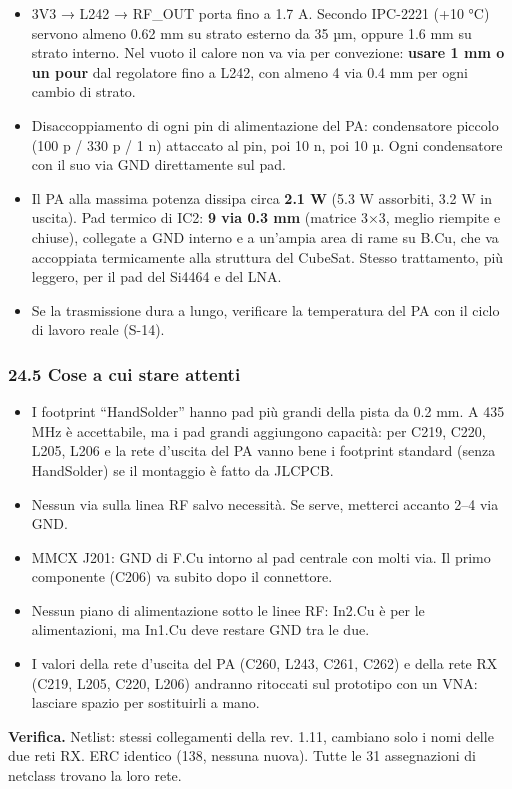 \begin{itemize}
\item 3V3 → L242 → RF\_\allowbreak{}OUT porta fino a 1.7 A. Secondo IPC-2221 (+10 °C) servono almeno 0.62 mm su strato esterno da 35 µm, oppure 1.6 mm su strato interno. Nel vuoto il calore non va via per convezione: \textbf{usare 1 mm o un pour} dal regolatore fino a L242, con almeno 4 via 0.4 mm per ogni cambio di strato.
\item Disaccoppiamento di ogni pin di alimentazione del PA: condensatore piccolo (100 p /\allowbreak{} 330 p /\allowbreak{} 1 n) attaccato al pin, poi 10 n, poi 10 µ. Ogni condensatore con il suo via GND direttamente sul pad.
\item Il PA alla massima potenza dissipa circa \textbf{2.1 W} (5.3 W assorbiti, 3.2 W in uscita). Pad termico di IC2: \textbf{9 via 0.3 mm} (matrice 3×3, meglio riempite e chiuse), collegate a GND interno e a un'ampia area di rame su B.Cu, che va accoppiata termicamente alla struttura del CubeSat. Stesso trattamento, più leggero, per il pad del Si4464 e del LNA.
\item Se la trasmissione dura a lungo, verificare la temperatura del PA con il ciclo di lavoro reale (S-14).
\end{itemize}

\subsubsection[24.5 Cose a cui stare attenti]{24.5 Cose a cui stare attenti}

\begin{itemize}
\item I footprint \textquotedblleft{}HandSolder\textquotedblright{} hanno pad più grandi della pista da 0.2 mm. A 435 MHz è accettabile, ma i pad grandi aggiungono capacità: per C219, C220, L205, L206 e la rete d'uscita del PA vanno bene i footprint standard (senza HandSolder) se il montaggio è fatto da JLCPCB.
\item Nessun via sulla linea RF salvo necessità. Se serve, metterci accanto 2–4 via GND.
\item MMCX J201: GND di F.Cu intorno al pad centrale con molti via. Il primo componente (C206) va subito dopo il connettore.
\item Nessun piano di alimentazione sotto le linee RF: In2.Cu è per le alimentazioni, ma In1.Cu deve restare GND tra le due.
\item I valori della rete d'uscita del PA (C260, L243, C261, C262) e della rete RX (C219, L205, C220, L206) andranno ritoccati sul prototipo con un VNA: lasciare spazio per sostituirli a mano.
\end{itemize}

\textbf{Verifica.} Netlist: stessi collegamenti della rev. 1.11, cambiano solo i nomi delle due reti RX. ERC identico (138, nessuna nuova). Tutte le 31 assegnazioni di netclass trovano la loro rete.
